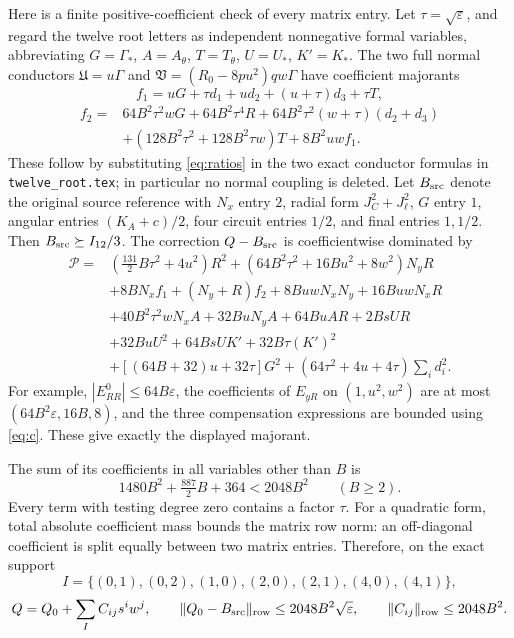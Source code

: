\documentclass[10pt]{article}
\newcommand{\eps}{\varepsilon}
\newcommand{\norm}[1]{\lVert#1\rVert_{\rm row}}
\begin{document}
Here is a finite positive-coefficient check of every matrix entry.
Let $\tau=\sqrt\eps$, and regard the twelve root letters as independent
nonnegative formal variables, abbreviating
$G=\Gamma_*$, $A=A_\theta$, $T=T_\theta$, $U=U_*$, $K'=K_*$.
The two full normal conductors $\mathfrak U=u\Gamma$ and
$\mathfrak V=(R_0-8pu^2)qw\Gamma$ have coefficient majorants
\[
 f_1=uG+\tau d_1+ud_2+(u+\tau)d_3+\tau T,
\]
\[
\begin{split}
 f_2={}&64B^2\tau^2wG+64B^2\tau^4R
 +64B^2\tau^2(w+\tau)(d_2+d_3)\\
 &+(128B^2\tau^2+128B^2\tau w)T+8B^2uwf_1.
\end{split}
\]
These follow by substituting \eqref{eq:ratios} in the two exact
conductor formulas in \texttt{twelve\_root.tex}; in particular no
normal coupling is deleted. Let $B_{\rm src}$ denote the original
source reference with $N_x$ entry $2$, radial form
$J_C^2+J_\ell^2$, $G$ entry $1$, angular entries $(K_A+c)/2$,
four circuit entries $1/2$, and final entries $1,1/2$.
Then $B_{\rm src}\succeq I_{12}/3$.
The correction $Q-B_{\rm src}$ is coefficientwise dominated by
\begin{align*}
 \mathcal P={}&(\tfrac{131}{2}B\tau^2+4u^2)R^2
 +(64B^2\tau^2+16Bu^2+8w^2)N_yR\\
 &+8BN_xf_1+(N_y+R)f_2+8BuwN_xN_y+16BuwN_xR\\
 &+40B^2\tau^2wN_xA+32BuN_yA+64BuAR+2BsUR\\
 &+32BuU^2+64BsUK'+32B\tau(K')^2\\
 &+[(64B+32)u+32\tau]G^2
 +(64\tau^2+4u+4\tau)\sum_i d_i^2.
\end{align*}
For example, $|E_{RR}^0|\le64B\eps$,
the coefficients of $E_{yR}$ on $(1,u^2,w^2)$ are at most
$(64B^2\eps,16B,8)$, and the three compensation expressions
are bounded using \eqref{eq:c}. These give exactly the displayed
majorant.

The sum of its coefficients in all variables other than $B$ is
\[
              1480B^2+\tfrac{887}{2}B+364<2048B^2
                       \qquad(B\ge2).
\]
Every term with testing degree zero contains a factor $\tau$.
For a quadratic form, total absolute coefficient mass bounds the
matrix row norm: an off-diagonal coefficient is split equally
between two matrix entries. Therefore, on the exact support
\[
 I=\{(0,1),(0,2),(1,0),(2,0),(2,1),(4,0),(4,1)\},
\]
\begin{equation}\label{eq:matrixbound}
 Q=Q_0+\sum_I C_{ij}s^iw^j,\qquad
 \norm{Q_0-B_{\rm src}}\le2048B^2\sqrt\eps,
 \qquad \norm{C_{ij}}\le2048B^2.
\end{equation}
\end{document}
